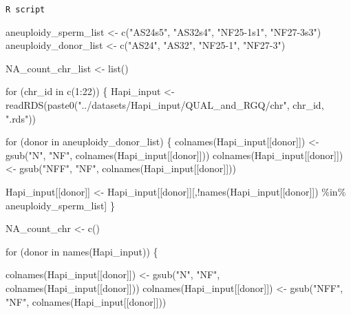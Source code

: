 \documentclass[
  letterpaper,
  DIV=11,
  numbers=noendperiod]{scrreprt}
\newenvironment{Shaded}{\begin{snugshade}}{\end{snugshade}}
\newcommand{\ControlFlowTok}[1]{\textcolor[rgb]{0.00,0.23,0.31}{#1}}
\newcommand{\DecValTok}[1]{\textcolor[rgb]{0.68,0.00,0.00}{#1}}
\newcommand{\FunctionTok}[1]{\textcolor[rgb]{0.28,0.35,0.67}{#1}}
\newcommand{\NormalTok}[1]{\textcolor[rgb]{0.00,0.23,0.31}{#1}}
\newcommand{\OtherTok}[1]{\textcolor[rgb]{0.00,0.23,0.31}{#1}}
\newcommand{\SpecialCharTok}[1]{\textcolor[rgb]{0.37,0.37,0.37}{#1}}
\newcommand{\StringTok}[1]{\textcolor[rgb]{0.13,0.47,0.30}{#1}}
\begin{document}
\begin{codelisting}

\caption{\texttt{R script}}

\begin{Shaded}
\begin{Highlighting}[]
\NormalTok{aneuploidy\_sperm\_list }\OtherTok{\textless{}{-}} \FunctionTok{c}\NormalTok{(}\StringTok{"AS24s5"}\NormalTok{, }\StringTok{"AS32s4"}\NormalTok{, }\StringTok{"NF25{-}1s1"}\NormalTok{, }\StringTok{"NF27{-}3s3"}\NormalTok{)}
\NormalTok{aneuploidy\_donor\_list }\OtherTok{\textless{}{-}} \FunctionTok{c}\NormalTok{(}\StringTok{"AS24"}\NormalTok{, }\StringTok{"AS32"}\NormalTok{, }\StringTok{"NF25{-}1"}\NormalTok{, }\StringTok{"NF27{-}3"}\NormalTok{)}

\NormalTok{NA\_count\_chr\_list }\OtherTok{\textless{}{-}} \FunctionTok{list}\NormalTok{()  }

\ControlFlowTok{for}\NormalTok{ (chr\_id }\ControlFlowTok{in} \FunctionTok{c}\NormalTok{(}\DecValTok{1}\SpecialCharTok{:}\DecValTok{22}\NormalTok{)) \{}
\NormalTok{  Hapi\_input }\OtherTok{\textless{}{-}} \FunctionTok{readRDS}\NormalTok{(}\FunctionTok{paste0}\NormalTok{(}\StringTok{"../datasets/Hapi\_input/QUAL\_and\_RGQ/chr"}\NormalTok{, chr\_id, }\StringTok{".rds"}\NormalTok{))}
  
  \ControlFlowTok{for}\NormalTok{ (donor }\ControlFlowTok{in}\NormalTok{ aneuploidy\_donor\_list) \{}
    \FunctionTok{colnames}\NormalTok{(Hapi\_input[[donor]]) }\OtherTok{\textless{}{-}} \FunctionTok{gsub}\NormalTok{(}\StringTok{"N"}\NormalTok{, }\StringTok{"NF"}\NormalTok{, }\FunctionTok{colnames}\NormalTok{(Hapi\_input[[donor]]))}
    \FunctionTok{colnames}\NormalTok{(Hapi\_input[[donor]]) }\OtherTok{\textless{}{-}} \FunctionTok{gsub}\NormalTok{(}\StringTok{"NFF"}\NormalTok{, }\StringTok{"NF"}\NormalTok{, }\FunctionTok{colnames}\NormalTok{(Hapi\_input[[donor]]))}
    
\NormalTok{    Hapi\_input[[donor]] }\OtherTok{\textless{}{-}}\NormalTok{ Hapi\_input[[donor]][,}\SpecialCharTok{!}\FunctionTok{names}\NormalTok{(Hapi\_input[[donor]]) }\SpecialCharTok{\%in\%}\NormalTok{ aneuploidy\_sperm\_list]}
\NormalTok{  \}}
  
\NormalTok{  NA\_count\_chr }\OtherTok{\textless{}{-}} \FunctionTok{c}\NormalTok{()}
  
  \ControlFlowTok{for}\NormalTok{ (donor }\ControlFlowTok{in} \FunctionTok{names}\NormalTok{(Hapi\_input)) \{}
    
    \FunctionTok{colnames}\NormalTok{(Hapi\_input[[donor]]) }\OtherTok{\textless{}{-}} \FunctionTok{gsub}\NormalTok{(}\StringTok{"N"}\NormalTok{, }\StringTok{"NF"}\NormalTok{, }\FunctionTok{colnames}\NormalTok{(Hapi\_input[[donor]]))}
    \FunctionTok{colnames}\NormalTok{(Hapi\_input[[donor]]) }\OtherTok{\textless{}{-}} \FunctionTok{gsub}\NormalTok{(}\StringTok{"NFF"}\NormalTok{, }\StringTok{"NF"}\NormalTok{, }\FunctionTok{colnames}\NormalTok{(Hapi\_input[[donor]]))}
    

\end{Highlighting}
\end{Shaded}
\end{codelisting}
\end{document}
